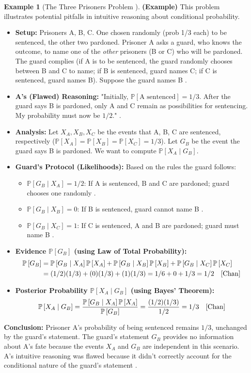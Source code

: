 \documentclass[12pt, a4paper]{article}
\theoremstyle{definition}
\newtheorem{example}{Example}[section] %
\theoremstyle{plain}
\newcommand{\Prob}[1]{\mathbb{P}\left[#1\right]} %
\newcommand{\condProb}[2]{\mathbb{P}\left[#1 \mid #2\right]} %
\begin{document}
\begin{example}[The Three Prisoners Problem \cite{Chan, Ross}]
\textbf{(Example)} This problem illustrates potential pitfalls in intuitive reasoning about conditional probability.
\begin{itemize}
    \item \textbf{Setup:} Prisoners A, B, C. One chosen randomly (prob 1/3 each) to be sentenced, the other two pardoned. Prisoner A asks a guard, who knows the outcome, to name one of the \textit{other} prisoners (B or C) who will be pardoned. The guard complies (if A is to be sentenced, the guard randomly chooses between B and C to name; if B is sentenced, guard names C; if C is sentenced, guard names B). Suppose the guard names B \cite{Chan}.
    \item \textbf{A's (Flawed) Reasoning:} "Initially, $\Prob{\text{A sentenced}} = 1/3$. After the guard says B is pardoned, only A and C remain as possibilities for sentencing. My probability must now be $1/2$." \cite{Chan, Ross}.
    \item \textbf{Analysis:} Let $X_A, X_B, X_C$ be the events that A, B, C are sentenced, respectively ($\Prob{X_A}=\Prob{X_B}=\Prob{X_C}=1/3$). Let $G_B$ be the event the guard says B is pardoned. We want to compute $\condProb{X_A}{G_B}$.
    \item \textbf{Guard's Protocol (Likelihoods):} Based on the rules the guard follows:
        \begin{itemize}
            \item $\condProb{G_B}{X_A} = 1/2$: If A is sentenced, B and C are pardoned; guard chooses one randomly \cite{Chan}.
            \item $\condProb{G_B}{X_B} = 0$: If B is sentenced, guard cannot name B \cite{Chan}.
            \item $\condProb{G_B}{X_C} = 1$: If C is sentenced, A and B are pardoned; guard must name B \cite{Chan}.
        \end{itemize}
    \item \textbf{Evidence $\Prob{G_B}$ (using Law of Total Probability):}
        \begin{align*} \Prob{G_B} &= \condProb{G_B}{X_A}\Prob{X_A} + \condProb{G_B}{X_B}\Prob{X_B} + \condProb{G_B}{X_C}\Prob{X_C} \\ &= (1/2)(1/3) + (0)(1/3) + (1)(1/3) = 1/6 + 0 + 1/3 = 1/2 \quad \cite{Chan}\end{align*}
    \item \textbf{Posterior Probability $\condProb{X_A}{G_B}$ (using Bayes' Theorem):}
        \[ \condProb{X_A}{G_B} = \frac{\condProb{G_B}{X_A}\Prob{X_A}}{\Prob{G_B}} = \frac{(1/2)(1/3)}{1/2} = 1/3 \quad \cite{Chan} \]
\end{itemize}
\textbf{Conclusion:} Prisoner A's probability of being sentenced remains $1/3$, unchanged by the guard's statement. The guard's statement $G_B$ provides no information about A's fate because the events $X_A$ and $G_B$ are independent in this scenario. A's intuitive reasoning was flawed because it didn't correctly account for the conditional nature of the guard's statement \cite{Chan, Ross}.
\end{example}
\end{document}
